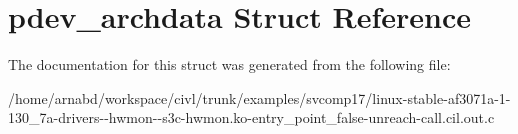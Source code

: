 \hypertarget{structpdev__archdata}{}\section{pdev\+\_\+archdata Struct Reference}
\label{structpdev__archdata}


The documentation for this struct was generated from the following file\+:\begin{DoxyCompactItemize}
\item 
/home/arnabd/workspace/civl/trunk/examples/svcomp17/linux-\/stable-\/af3071a-\/1-\/130\+\_\+7a-\/drivers-\/-\/hwmon-\/-\/s3c-\/hwmon.\+ko-\/entry\+\_\+point\+\_\+false-\/unreach-\/call.\+cil.\+out.\+c\end{DoxyCompactItemize}
